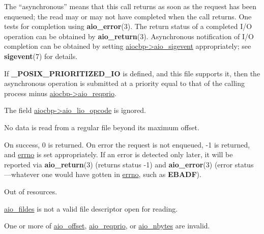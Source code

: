 \documentclass[]{article}
\let\realtextbf=\textbf
\renewcommand{\textbf}[1]{\textcolor{boldcolor}{\realtextbf{#1}}}
\renewcommand{\emph}[1]{\underline{#1}}
\begin{document}
The ``asynchronous'' means that this call returns as soon as the request
has been enqueued; the read may or may not have completed when the call
returns. One tests for completion using \textbf{aio\_error}(3). The
return status of a completed I/O operation can be obtained by
\textbf{aio\_return}(3). Asynchronous notification of I/O completion can
be obtained by setting \emph{aiocbp-\textgreater{}aio\_sigevent}
appropriately; see \textbf{sigevent}(7) for details.

If \textbf{\_POSIX\_PRIORITIZED\_IO} is defined, and this file supports
it, then the asynchronous operation is submitted at a priority equal to
that of the calling process minus
\emph{aiocbp-\textgreater{}aio\_reqprio}.

The field \emph{aiocbp-\textgreater{}aio\_lio\_opcode} is ignored.

No data is read from a regular file beyond its maximum offset.


On success, 0 is returned. On error the request is not enqueued, -1 is
returned, and \emph{errno} is set appropriately. If an error is detected
only later, it will be reported via \textbf{aio\_return}(3) (returns
status -1) and \textbf{aio\_error}(3) (error status---whatever one would
have gotten in \emph{errno}, such as \textbf{EBADF}).


\begin{description}
\itemsep1pt\parskip0pt
\item[\textbf{EAGAIN}]
Out of resources.
\end{description}

\begin{description}
\itemsep1pt\parskip0pt
\item[\textbf{EBADF}]
\emph{aio\_fildes} is not a valid file descriptor open for reading.
\end{description}

\begin{description}
\itemsep1pt\parskip0pt
\item[\textbf{EINVAL}]
One or more of \emph{aio\_offset}, \emph{aio\_reqprio}, or
\emph{aio\_nbytes} are invalid.
\end{description}
\end{document}
